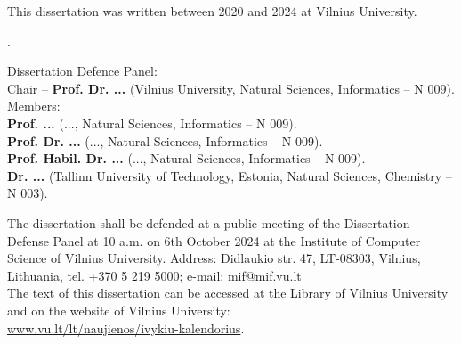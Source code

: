 \begin{singlespace}
\noindent\nohyphens{This dissertation was written between 2020 and 2024 at Vilnius University.}\\
\vspace{1cm}

.

\vspace{2cm}
\noindent
Dissertation Defence Panel: \\
{Chair  --} {{\bf Prof. Dr. ...} (Vilnius University, Natural Sciences, Informatics -- N 009)}.\\
Members:\\ %
{\bf Prof. ... }
(..., Natural Sciences, Informatics -- N 009).\\
{\bf Prof. Dr. ...}
(..., Natural Sciences, Informatics -- N 009).\\
{\bf Prof. Habil. Dr. ...} 
(..., Natural Sciences, Informatics -- N 009).\\
{\bf Dr. ...}
(Tallinn University of Technology, Estonia, Natural Sciences, Chemistry -- N 003).\\


\vspace{2cm}

\noindent
The dissertation shall be defended at a public meeting of the Dissertation
Defense Panel at 10 a.m. on 6th October 2024 at the Institute of Computer Science of Vilnius University. Address: Didlaukio str. 47, LT-08303, Vilnius, Lithuania, 
tel. +370 5 219 5000; e-mail: mif@mif.vu.lt \\

\vspace{1cm}
\noindent
The text of this dissertation can be accessed at the Library of Vilnius
University and on the website of Vilnius
University:\\ \href{ www.vu.lt/lt/naujienos/ivykiu-kalendorius}{ www.vu.lt/lt/naujienos/ivykiu-kalendorius}.



\end{singlespace}

